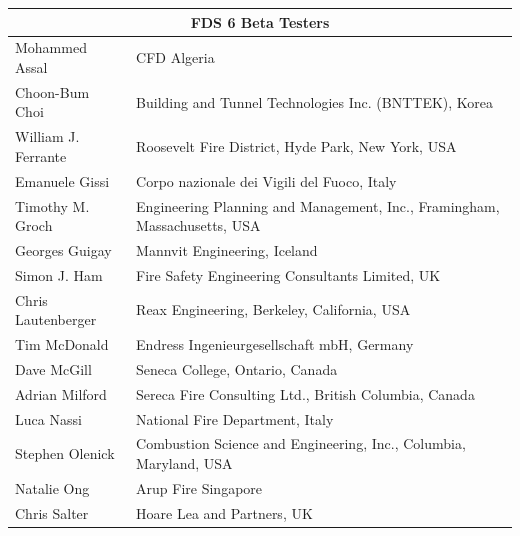 \documentclass[11pt]{book}
\begin{document}
\newpage

\begin{longtable}{|l|l|}
\hline
\multicolumn{2}{|c|}{\bf FDS 6 Beta Testers} \\ \hline \hline
Mohammed Assal                          & CFD Algeria                                                               \\ \hline
Choon-Bum Choi                          & Building and Tunnel Technologies Inc. (BNTTEK), Korea                     \\ \hline
William J. Ferrante                     & Roosevelt Fire District, Hyde Park, New York, USA                         \\ \hline
Emanuele Gissi                          & Corpo nazionale dei Vigili del Fuoco, Italy                               \\ \hline
Timothy M. Groch                        & Engineering Planning and Management, Inc., Framingham, Massachusetts, USA \\ \hline
Georges Guigay                          & Mannvit Engineering, Iceland                                              \\ \hline
Simon J. Ham                            & Fire Safety Engineering Consultants Limited, UK                           \\ \hline
Chris Lautenberger                      & Reax Engineering, Berkeley, California, USA                               \\ \hline
Tim McDonald                            & Endress Ingenieurgesellschaft mbH, Germany                                \\ \hline
Dave McGill                             & Seneca College, Ontario, Canada                                           \\ \hline
Adrian Milford                          & Sereca Fire Consulting Ltd., British Columbia, Canada                     \\ \hline
Luca Nassi                              & National Fire Department, Italy                                           \\ \hline
Stephen Olenick                         & Combustion Science and Engineering, Inc., Columbia, Maryland, USA         \\ \hline
Natalie Ong                             & Arup Fire Singapore                                                       \\ \hline
Chris Salter                            & Hoare Lea and Partners, UK                                                \\ \hline

\end{longtable}
\end{document}
